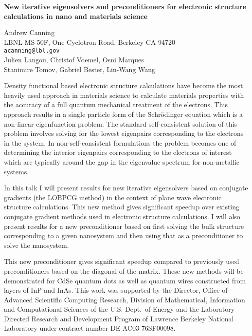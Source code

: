 \documentclass{report}
\begin{document}

\begin{center}
{\large
{\bf New iterative eigensolvers and preconditioners for electronic structure calculations in nano and materials science}}

	Andrew Canning \\
	LBNL MS-50F, One Cyclotron Road, Berkeley CA 94720 \\
	{\tt acanning@lbl.gov} \\
	Julien Langou, Christof Voemel, Osni Marques \\
	Stanimire Tomov, Gabriel Bester, Lin-Wang Wang
\end{center}
Density functional based electronic structure calculations
have become the most heavily used approach in materials
science to calculate materials properties with the accuracy
of a full quantum mechanical treatment of the electrons.
This approach results in a single particle form of the
Schr\"{o}dinger equation which is a non-linear eigenfunction
problem. The standard self-consistent solution of this
problem involves solving for the lowest eigenpairs
corresponding to the electrons in the system. In
non-self-consistent formulations the problem becomes one of
determining the interior eigenpairs corresponding to the
electrons of interest which are typically around the gap in
the eigenvalue spectrum for non-metallic systems.

In this
talk I will present results for new iterative eigensolvers
based on conjugate gradients (the LOBPCG method) in the
context of plane wave electronic structure calculations.
This new method gives significant speedup over existing
conjugate gradient methods used in electronic structure
calculations.
I will also present results for a new
preconditioner based on first solving the bulk structure
corresponding to a given nanosystem and then using that as a
preconditioner to solve the nanosystem.

This new
preconditioner gives significant speedup compared to
previously used preconditioners based on the diagonal of the
matrix. These new methods will be demonstrated for CdSe
quantum dots as well as quantum wires constructed from
layers of InP and InAs.  This work was supported by the
Director, Office of Advanced Scientific Computing Research,
Division of Mathematical, Information and Computational
Sciences of the U.S. Dept.~of Energy and the Laboratory
Directed Research and Development Program of Lawrence
Berkeley National Laboratory under contract number
DE-AC03-76SF00098.



\end{document}

